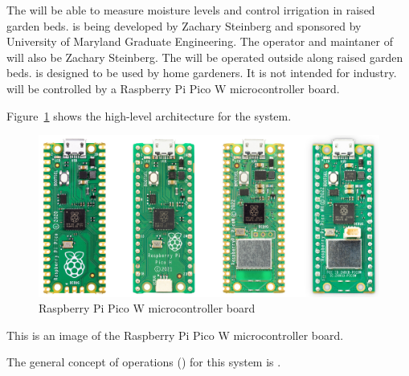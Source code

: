 The \ThisSystem will be able to measure moisture levels and control irrigation in raised garden beds. 
\ThisSys is being developed by Zachary Steinberg and sponsored by University of Maryland Graduate Engineering. 
The operator and maintaner of \ThisSys will also be Zachary Steinberg. The \ThisSys will be operated outside along raised garden beds. 
\ThisSys is designed to be used by home gardeners. It is not intended for industry. \ThisSys will be controlled by a Raspberry Pi Pico W microcontroller board.

Figure~\ref{fig:SystemOverview} shows the high-level architecture for the \ThisSys system. 
\begin{figure}[htbp]
	\centering
		\includegraphics[width=6in]{images/pico_family.jpg}
		\caption{Raspberry Pi Pico W microcontroller board}
	\label{fig:SystemOverview}
\end{figure}
This is an image of the Raspberry Pi Pico W microcontroller board.


The general concept of operations (\CONOP) for this system is \TBD.





